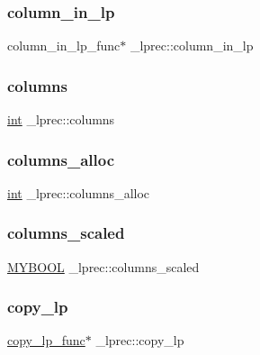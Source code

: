 \subsubsection{\texorpdfstring{column\+\_\+in\+\_\+lp}{column\_in\_lp}}
{\footnotesize\ttfamily column\+\_\+in\+\_\+lp\+\_\+func$\ast$ \+\_\+lprec\+::column\+\_\+in\+\_\+lp}

\mbox{\label{struct__lprec_a36cb2d0c73bb2b65074f21981fbfb750}} 
\subsubsection{\texorpdfstring{columns}{columns}}
{\footnotesize\ttfamily \hyperlink{lp__lib_8h_adeb9ec6400320e4923ac9d836d509ddb}{int} \+\_\+lprec\+::columns}

\mbox{\label{struct__lprec_a0c93af0e4d339c1a921906913fedf8f9}} 
\subsubsection{\texorpdfstring{columns\+\_\+alloc}{columns\_alloc}}
{\footnotesize\ttfamily \hyperlink{lp__lib_8h_adeb9ec6400320e4923ac9d836d509ddb}{int} \+\_\+lprec\+::columns\+\_\+alloc}

\mbox{\label{struct__lprec_a573bb547706a2e5c88930b0bd256ec2a}} 
\subsubsection{\texorpdfstring{columns\+\_\+scaled}{columns\_scaled}}
{\footnotesize\ttfamily \hyperlink{lp__lib_8h_aad848328fb3018217ac9f01d97b6bd88}{M\+Y\+B\+O\+OL} \+\_\+lprec\+::columns\+\_\+scaled}

\mbox{\label{struct__lprec_a1cad58f715407b4a4494d78e03e4546a}} 
\subsubsection{\texorpdfstring{copy\+\_\+lp}{copy\_lp}}
{\footnotesize\ttfamily \hyperlink{lp__lib_8h_ae46b876207aec7279c11fa3b98f6b070}{copy\+\_\+lp\+\_\+func}$\ast$ \+\_\+lprec\+::copy\+\_\+lp}

